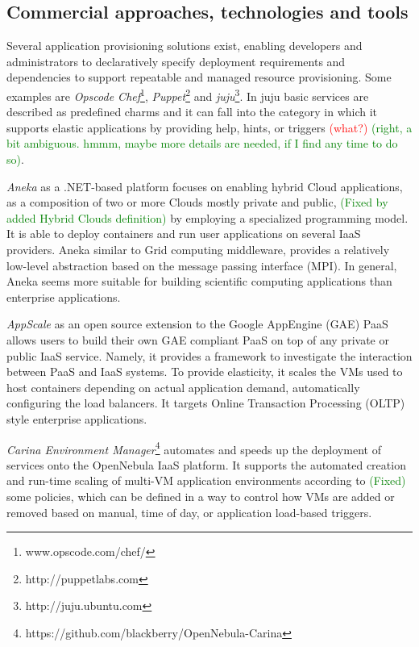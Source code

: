 \documentclass{sig-alternate}
\newcommand\todo[1]{\textcolor{red}{(#1)}}
\newcommand\done[1]{\textcolor{green}{(#1)}}
\begin{document}
\subsection{Commercial approaches, technologies and tools}
\label{sec:tools}
Several application provisioning solutions exist, enabling developers and administrators to declaratively specify deployment requirements and dependencies to support repeatable and managed resource provisioning. Some examples are \emph{Opscode Chef}\footnote{www.opscode.com/chef/}, \emph{Puppet}\footnote{http://puppetlabs.com} and \emph{juju}\footnote{http://juju.ubuntu.com}. In juju basic services are described as predefined charms and it can fall into the category in which it supports elastic applications by providing help, hints, or triggers \todo{what?} \done{right, a bit ambiguous. hmmm, maybe more details are needed, if I find any time to do so}.
 
\emph{Aneka} \cite{vecchiola2009aneka} as a .NET-based platform focuses on enabling hybrid Cloud applications, as a composition of two or more Clouds mostly private and public, %
\done{Fixed by added Hybrid Clouds definition}
by employing a specialized programming model. It is able to deploy containers and run user applications on several IaaS providers. Aneka similar to Grid computing middleware, provides a relatively low-level abstraction based on the message passing interface (MPI). In general, Aneka seems more suitable for building scientific computing applications than enterprise applications. 

\emph{AppScale} \cite{chohan2009appscale} as an open source extension to the Google AppEngine (GAE) PaaS allows users to build their own GAE compliant PaaS on top of any private or public IaaS service. Namely, it provides a framework to investigate the interaction between PaaS and IaaS systems. To provide elasticity, it scales the VMs used to host containers depending on actual application demand, automatically configuring the load balancers. It targets Online Transaction Processing (OLTP) style enterprise applications.

\emph{Carina Environment Manager}\footnote{https://github.com/blackberry/OpenNebula-Carina} automates and speeds up the deployment of services onto the OpenNebula IaaS platform. It supports the automated creation and run-time scaling of multi-VM application environments according to %
\done{Fixed} some policies, which can be defined in a way to control how VMs are added or removed based on manual, time of day, or application load-based triggers. 
\end{document}
